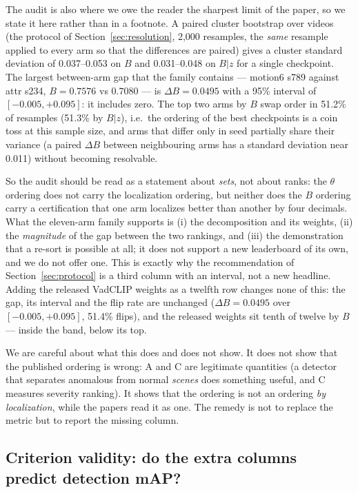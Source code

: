 \documentclass[number,preprint,12pt]{elsarticle}
\begin{document}
The audit is also where we owe the reader the sharpest limit of the paper, so we
state it here rather than in a footnote. A paired cluster bootstrap over videos
(the protocol of Section~\ref{sec:resolution}, 2,000 resamples, the \emph{same}
resample applied to every arm so that the differences are paired) gives a
cluster standard deviation of 0.037--0.053 on \(B\) and 0.031--0.048 on \(B|z\) for a
single checkpoint. The largest between-arm gap that the family contains ---
motion6 s789 against attr s234, \(B=0.7576\) vs \(0.7080\) --- is \(\Delta B=0.0495\)
with a 95\% interval of \([-0.005,+0.095]\): it includes zero. The top two arms by
\(B\) swap order in 51.2\% of resamples (51.3\% by \(B|z\)), i.e.~the ordering of the
best checkpoints is a coin toss at this sample size, and arms that differ only in
seed partially share their variance (a paired \(\Delta B\) between neighbouring
arms has a standard deviation near 0.011) without becoming resolvable.

So the audit should be read as a statement about \emph{sets}, not about ranks: the
\(\theta\) ordering does not carry the localization ordering, but neither does the
\(B\) ordering carry a certification that one arm localizes better than another by
four decimals. What the eleven-arm family supports is (i) the decomposition and
its weights, (ii) the \emph{magnitude} of the gap between the two rankings, and (iii)
the demonstration that a re-sort is possible at all; it does not support a new
leaderboard of its own, and we do not offer one. This is exactly why the
recommendation of Section~\ref{sec:protocol} is a third column with an interval,
not a new headline. Adding the released VadCLIP weights as a twelfth row changes
none of this: the gap, its interval and the flip rate are unchanged
(\(\Delta B=0.0495\) over \([-0.005,+0.095]\), 51.4\% flips), and the released
weights sit tenth of twelve by \(B\) --- inside the band, below its top.

We are careful about what this does and does not show. It does not show that the
published ordering is wrong: A and C are legitimate quantities (a detector that
separates anomalous from normal \emph{scenes} does something useful, and C measures
severity ranking). It shows that the ordering is not an ordering \emph{by
localization}, while the papers read it as one. The remedy is not to replace the
metric but to report the missing column.

\subsection{Criterion validity: do the extra columns predict detection mAP?}\label{sec:criterion}
\end{document}

